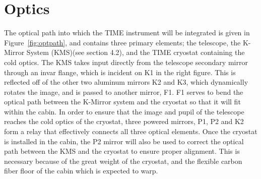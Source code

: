 \documentclass[manuscript]{aastex}
\begin{document}
\section{Optics}

The optical path into which the TIME instrument will be integrated is given in Figure~\ref{fig:optpath}, and contains three primary elements; the telescope, the K-Mirror System (KMS)(see section 4.2), and the TIME cryostat containing the cold optics. The KMS takes input directly from the telescope secondary mirror through an invar flange, which is incident on K1 in the right figure. This is reflected off of the other two aluminum mirrors K2 and K3, which dynamically rotates the image, and is passed to another mirror, F1. F1 serves to bend the optical path between the K-Mirror system and the cryostat so that it will fit within the cabin. In order to ensure that the image and pupil of the telescope reaches the cold optics of the cryostat, three powered mirrors, P1, P2 and K2 form a relay that effectively connects all three optical elements. Once the cryostat is installed in the cabin, the P2 mirror will also be used to correct the optical path between the KMS and the cryostat to ensure proper alignment. This is necessary because of the great weight of the cryostat, and the flexible carbon fiber floor of the cabin which is expected to warp.
\end{document}
